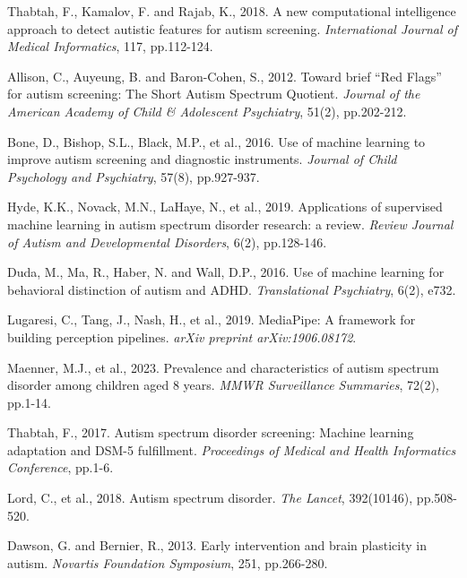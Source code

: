 \documentclass[12pt,letterpaper]{article}
\begin{document}
\begin{enumerate}[label={[\arabic*]}]
    \item Thabtah, F., Kamalov, F. and Rajab, K., 2018. A new computational intelligence approach to detect autistic features for autism screening. \textit{International Journal of Medical Informatics}, 117, pp.112-124.
    
    \item Allison, C., Auyeung, B. and Baron-Cohen, S., 2012. Toward brief ``Red Flags'' for autism screening: The Short Autism Spectrum Quotient. \textit{Journal of the American Academy of Child \& Adolescent Psychiatry}, 51(2), pp.202-212.
    
    \item Bone, D., Bishop, S.L., Black, M.P., et al., 2016. Use of machine learning to improve autism screening and diagnostic instruments. \textit{Journal of Child Psychology and Psychiatry}, 57(8), pp.927-937.
    
    \item Hyde, K.K., Novack, M.N., LaHaye, N., et al., 2019. Applications of supervised machine learning in autism spectrum disorder research: a review. \textit{Review Journal of Autism and Developmental Disorders}, 6(2), pp.128-146.
    
    \item Duda, M., Ma, R., Haber, N. and Wall, D.P., 2016. Use of machine learning for behavioral distinction of autism and ADHD. \textit{Translational Psychiatry}, 6(2), e732.
    
    \item Lugaresi, C., Tang, J., Nash, H., et al., 2019. MediaPipe: A framework for building perception pipelines. \textit{arXiv preprint arXiv:1906.08172}.
    
    \item Maenner, M.J., et al., 2023. Prevalence and characteristics of autism spectrum disorder among children aged 8 years. \textit{MMWR Surveillance Summaries}, 72(2), pp.1-14.
    
    \item Thabtah, F., 2017. Autism spectrum disorder screening: Machine learning adaptation and DSM-5 fulfillment. \textit{Proceedings of Medical and Health Informatics Conference}, pp.1-6.
    
    \item Lord, C., et al., 2018. Autism spectrum disorder. \textit{The Lancet}, 392(10146), pp.508-520.
    
    \item Dawson, G. and Bernier, R., 2013. Early intervention and brain plasticity in autism. \textit{Novartis Foundation Symposium}, 251, pp.266-280.
\end{enumerate}
\end{document}
